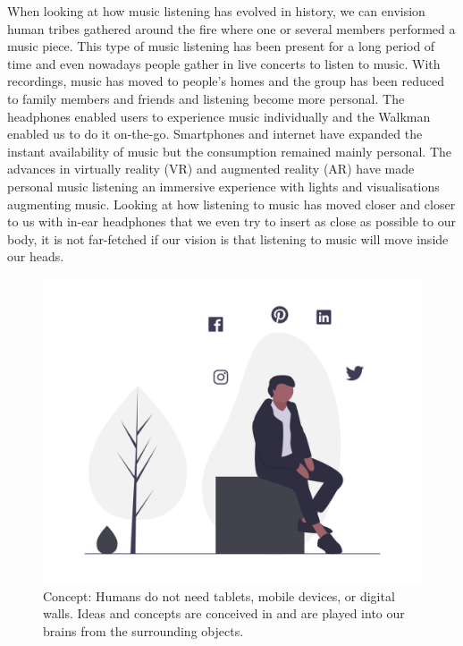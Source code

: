 \documentclass[sigchi]{acmart}
\begin{document}
When looking at how music listening has evolved in history, we can envision human tribes gathered around the fire where one or several members performed a music piece. This type of music listening has been present for a long period  of time and even nowadays people gather in live concerts to listen to music. With recordings, music has moved to people's homes and the group has been reduced to family members and friends and listening become more personal. The headphones enabled users to experience music individually and the Walkman enabled us to do it on-the-go. Smartphones and internet have expanded the instant availability of music but the consumption remained mainly personal. The advances in virtually reality (VR) and augmented reality (AR) have made personal music listening an immersive experience with lights and visualisations augmenting music. Looking at how listening to music has moved closer and closer to us with in-ear headphones that we even try to insert as close as possible to our body, it is not far-fetched if our vision is that listening to music will move inside our heads.
\begin{figure}[h]
  \centering
   \includegraphics[width=\linewidth]{acmart-master-2/samples/thinkbnw.png}
  \caption{Concept: Humans do not need tablets, mobile devices, or digital walls. Ideas and concepts are conceived in and are played into our brains from the surrounding objects.}
  \label{fig: think}
\end{figure}
\end{document}
